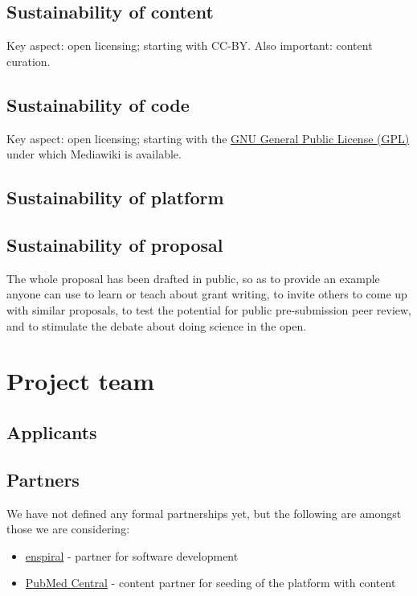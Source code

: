 \documentclass[final,authoryear,3p]{elsarticle-open-drafting}
\begin{document}
\subsection{Sustainability of content}
Key aspect: open licensing; starting with CC-BY.
Also important: content curation.

\subsection{Sustainability of code}
Key aspect: open licensing; starting with the \href{http://www.gnu.org/licenses/gpl.html}{GNU General Public License (GPL)} under which Mediawiki is available.

\subsection{Sustainability of platform}
\subsection{Sustainability of proposal}
The whole proposal has been drafted in public, so as to provide an example anyone can use 
to learn or teach about grant writing, to invite others to come up with similar proposals, to test the potential for public pre-submission peer review, and to stimulate the debate about doing science in the open.

\section{Project team}
\subsection{Applicants}
\subsection{Partners}
We have not defined any formal partnerships yet, but the following are amongst those we are considering:
\begin{itemize}
	\item \href{http://www.enspiral.com}{enspiral} - partner for software development
	\item \href{http://www.ncbi.nlm.nih.gov/pmc/}{PubMed Central} - content partner for seeding of the platform with content
	
\end{itemize}

\end{document}
